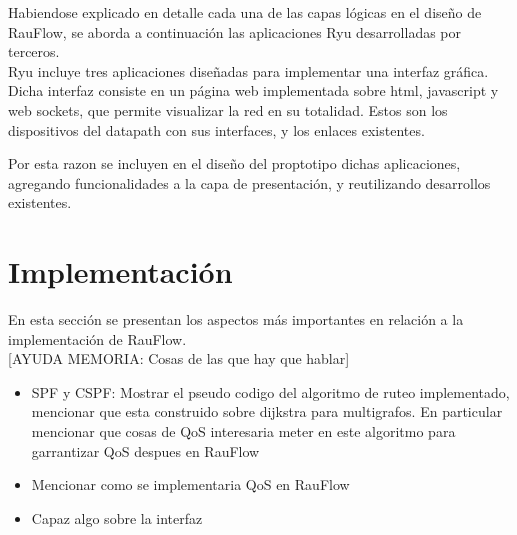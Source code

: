 Habiendose explicado en detalle cada una de las capas l\'ogicas en el dise\~no de RauFlow, se aborda a continuaci\'on las aplicaciones Ryu desarrolladas por terceros.\\

Ryu incluye tres aplicaciones dise\~nadas para implementar una interfaz gr\'afica. Dicha interfaz consiste en un p\'agina web implementada sobre html, javascript y web sockets, que permite visualizar la red en su totalidad. Estos son los dispositivos del datapath con sus interfaces, y los enlaces existentes.

Por esta razon se incluyen en el dise\~no del proptotipo dichas aplicaciones, agregando funcionalidades  a la capa de presentaci\'on, y reutilizando desarrollos existentes.



\section[Implementaci\'on]{Implementaci\'on}

En esta secci\'on se presentan los aspectos m\'as importantes en relaci\'on a la implementaci\'on de RauFlow.\\

[AYUDA MEMORIA: Cosas de las que hay que hablar]

\begin{itemize}
\item SPF y CSPF: Mostrar el pseudo codigo del algoritmo de ruteo implementado, mencionar que esta construido sobre dijkstra para multigrafos. En particular mencionar que cosas de QoS interesaria meter en este algoritmo para garrantizar QoS despues en RauFlow

\item Mencionar como se implementaria QoS en RauFlow

\item Capaz algo sobre la interfaz 
\end{itemize}